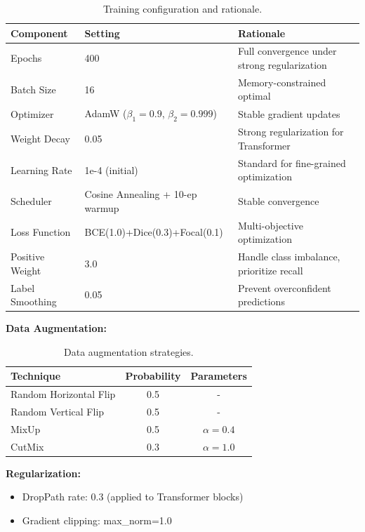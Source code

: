 \documentclass[journal]{IEEEtran}
\begin{document}
\begin{table}[H]
\centering
\caption{Training configuration and rationale.}
\label{tab:training_config}
\begin{tabular}{lll}
\toprule
\textbf{Component} & \textbf{Setting} & \textbf{Rationale} \\
\midrule
Epochs & 400 & Full convergence under strong regularization \\
Batch Size & 16 & Memory-constrained optimal \\
Optimizer & AdamW ($\beta_1=0.9$, $\beta_2=0.999$) & Stable gradient updates \\
Weight Decay & 0.05 & Strong regularization for Transformer \\
Learning Rate & 1e-4 (initial) & Standard for fine-grained optimization \\
Scheduler & Cosine Annealing + 10-ep warmup & Stable convergence \\
Loss Function & BCE(1.0)+Dice(0.3)+Focal(0.1) & Multi-objective optimization \\
Positive Weight & 3.0 & Handle class imbalance, prioritize recall \\
Label Smoothing & 0.05 & Prevent overconfident predictions \\
\bottomrule
\end{tabular}
\end{table}

\textbf{Data Augmentation:}

\begin{table}[H]
\centering
\caption{Data augmentation strategies.}
\label{tab:augmentation}
\begin{tabular}{lcc}
\toprule
\textbf{Technique} & \textbf{Probability} & \textbf{Parameters} \\
\midrule
Random Horizontal Flip & 0.5 & - \\
Random Vertical Flip & 0.5 & - \\
MixUp & 0.5 & $\alpha=0.4$ \\
CutMix & 0.3 & $\alpha=1.0$ \\
\bottomrule
\end{tabular}
\end{table}

\textbf{Regularization:}
\begin{itemize}
\item DropPath rate: 0.3 (applied to Transformer blocks)
\item Gradient clipping: max\_norm=1.0
\end{itemize}
\end{document}
